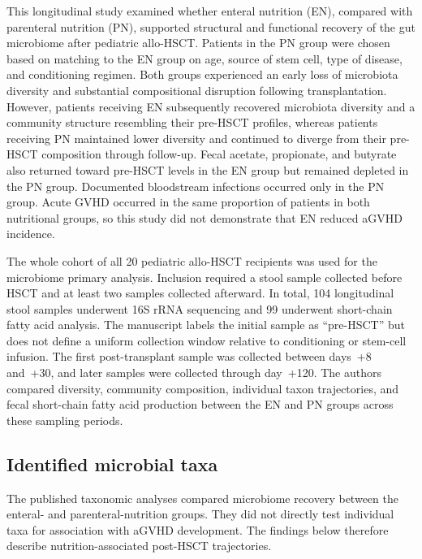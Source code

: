 \documentclass[11pt,a4paper]{article}
\begin{document}
This longitudinal study examined whether enteral nutrition (EN), compared with parenteral nutrition (PN), supported structural and functional recovery of the gut microbiome after pediatric allo-HSCT. Patients in the PN group were chosen based on matching to the EN group on age, source of stem cell, type of disease, and conditioning regimen. Both groups experienced an early loss of microbiota diversity and substantial compositional disruption following transplantation. However, patients receiving EN subsequently recovered microbiota diversity and a community structure resembling their pre-HSCT profiles, whereas patients receiving PN maintained lower diversity and continued to diverge from their pre-HSCT composition through follow-up. Fecal acetate, propionate, and butyrate also returned toward pre-HSCT levels in the EN group but remained depleted in the PN group. Documented bloodstream infections occurred only in the PN group. Acute GVHD occurred in the same proportion of patients in both nutritional groups, so this study did not demonstrate that EN reduced aGVHD incidence.
\par

The whole cohort of all 20 pediatric allo-HSCT recipients was used for the microbiome primary analysis. Inclusion required a stool sample collected before HSCT and at least two samples collected afterward. In total, 104 longitudinal stool samples underwent 16S rRNA sequencing and 99 underwent short-chain fatty acid analysis. The manuscript labels the initial sample as ``pre-HSCT'' but does not define a uniform collection window relative to conditioning or stem-cell infusion. The first post-transplant sample was collected between days~+8 and~+30, and later samples were collected through day~+120. The authors compared diversity, community composition, individual taxon trajectories, and fecal short-chain fatty acid production between the EN and PN groups across these sampling periods.
\par

\subsection{Identified microbial taxa}

The published taxonomic analyses compared microbiome recovery between the enteral- and parenteral-nutrition groups. They did not directly test individual taxa for association with aGVHD development. The findings below therefore describe nutrition-associated post-HSCT trajectories.
\end{document}
